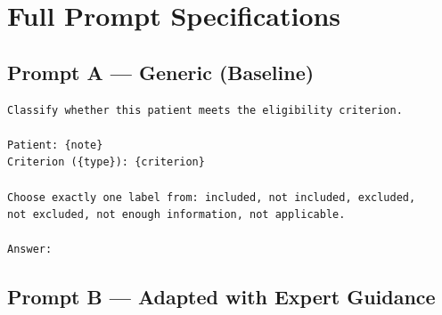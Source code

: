 
\chapter{Full Prompt Specifications}
\label{app:prompts}

\section{Prompt A --- Generic (Baseline)}
\label{sec:app-prompt-a}

\begin{lstlisting}[caption={Prompt A for Instruct models},
                   label={lst:prompt-a-instruct}]
Classify whether this patient meets the eligibility criterion.

Patient: {note}
Criterion ({type}): {criterion}

Choose exactly one label from: included, not included, excluded,
not excluded, not enough information, not applicable.

Answer:
\end{lstlisting}


\section{Prompt B --- Adapted with Expert Guidance}
\label{sec:app-prompt-b}


